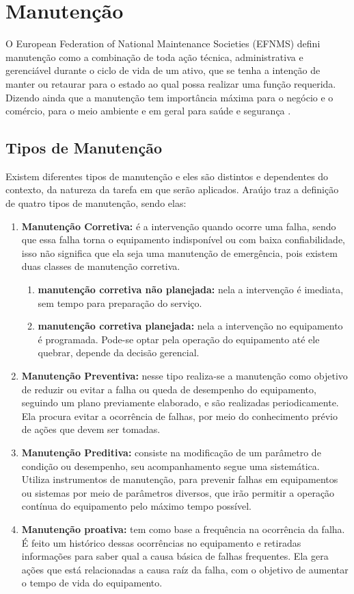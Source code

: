 \chapter{Manutenção}
\label{cap-manutencao}

O European Federation of National Maintenance Societies (EFNMS) defini manutenção como a combinação de toda ação técnica, administrativa e gerenciável durante o ciclo de vida de um ativo, que se tenha a intenção de manter ou retaurar para o estado ao qual possa realizar uma função requerida. Dizendo ainda que a manutenção tem importância máxima para o negócio e o comércio, para o meio ambiente e em geral para saúde e segurança \cite{efnms}.

\section{Tipos de Manutenção}

Existem diferentes tipos de manutenção e eles são distintos e dependentes do contexto, da natureza da tarefa em que serão aplicados. Araújo \cite{araujo2015} traz a definição de quatro tipos de manutenção, sendo elas:

\begin{enumerate}
	\item \textbf{Manutenção Corretiva:} é a intervenção quando ocorre uma falha, sendo que essa falha torna o equipamento indisponível ou com baixa confiabilidade, isso não significa que ela seja uma manutenção de emergência, pois existem duas classes de manutenção corretiva.
		\begin{enumerate}
			\item \textbf{manutenção corretiva não planejada:} nela a intervenção é imediata, sem tempo para preparação do serviço.
			\item \textbf{manutenção corretiva planejada:} nela a intervenção no equipamento é programada. Pode-se optar pela operação do equipamento até ele quebrar, depende da decisão gerencial.
		\end{enumerate}
	\item \textbf{Manutenção Preventiva:} nesse tipo realiza-se a manutenção como objetivo de reduzir ou evitar a falha ou queda de desempenho do equipamento, seguindo um plano previamente elaborado, e são realizadas periodicamente. Ela procura evitar a ocorrência de falhas, por meio do conhecimento prévio de ações que devem ser tomadas.
	\item \textbf{Manutenção Preditiva:} consiste na modificação de um parâmetro de condição ou desempenho, seu acompanhamento segue uma sistemática. Utiliza instrumentos de manutenção, para prevenir falhas em equipamentos ou sistemas por meio de parâmetros diversos, que irão permitir a operação contínua do equipamento pelo máximo tempo possível.
	\item \textbf{Manutenção proativa:} tem como base a frequência na ocorrência da falha. É feito um histórico dessas ocorrências no equipamento e retiradas informações para saber qual a causa básica de falhas frequentes. Ela gera ações que está relacionadas a causa raíz da falha, com o objetivo de aumentar o tempo de vida do equipamento.
\end{enumerate}

